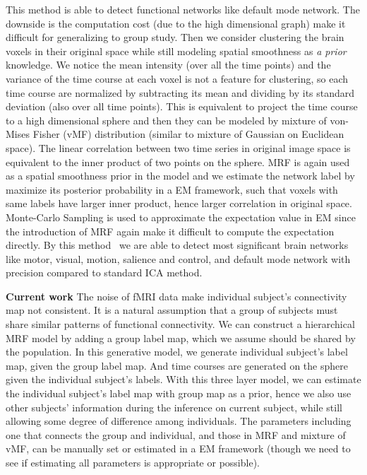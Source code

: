 \documentclass[]{article}
\begin{document}
This method is able to detect functional networks like default mode network. The
downside is the computation cost (due to the high dimensional graph) make it
difficult for generalizing to group study. Then we consider clustering the brain
voxels in their original space while still modeling spatial smoothness as
\emph{a prior} knowledge. We notice the mean intensity (over all the time
points) and the variance of the time course at each voxel is not a feature for
clustering, so each time course are normalized by subtracting its mean and
dividing by its standard deviation (also over all time points). This is
equivalent to project the time course to a high dimensional sphere and then they
can be modeled by mixture of von-Mises Fisher (vMF) distribution (similar to
mixture of Gaussian on Euclidean space). The linear correlation between two time
series in original image space is equivalent to the inner product of two points
on the sphere.  MRF is again used as a spatial smoothness prior in the model and
we estimate the network label by maximize its posterior probability in a EM
framework, such that voxels with same labels have larger inner product, hence
larger correlation in original space. Monte-Carlo Sampling is used to
approximate the expectation value in EM since the introduction of MRF again make
it difficult to compute the expectation directly. By this
method~\cite{SCI:Liu2011a} we are able to detect most significant brain networks
like motor, visual, motion, salience and control, and default mode network with
precision compared to standard ICA method.

\textbf{Current work} The noise of fMRI data make individual subject's
connectivity map not consistent. It is a natural assumption that a group of
subjects must share similar patterns of functional connectivity. We can
construct a hierarchical MRF model by adding a group label map, which we assume
should be shared by the population. In this generative model, we generate
individual subject's label map, given the group label map. And time courses are
generated on the sphere given the individual subject's labels. With this three
layer model, we can estimate the individual subject's label map with group map
as a prior, hence we also use other subjects' information during the inference
on current subject, while still allowing some degree of difference among
individuals. The parameters including one that connects the group and
individual, and those in MRF and mixture of vMF, can be manually set or
estimated in a EM framework (though we need to see if estimating all parameters
is appropriate or possible).
\end{document}
